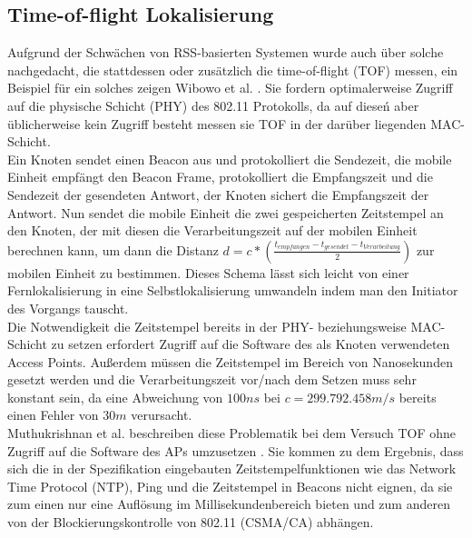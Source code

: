 \subsection{Time-of-flight Lokalisierung}
\label{ch:Vorherige:sec:TOF}
Aufgrund der Schwächen von RSS-basierten Systemen wurde auch über solche nachgedacht, die stattdessen oder zusätzlich die time-of-flight (TOF) messen, ein Beispiel für ein solches zeigen Wibowo et al. \cite{wibowo2009time}. 
Sie fordern optimalerweise Zugriff auf die physische Schicht (PHY) des 802.11 Protokolls, da auf dieseń aber üblicherweise kein Zugriff besteht messen sie TOF in der darüber liegenden MAC-Schicht.\\
Ein Knoten sendet einen Beacon aus und protokolliert die Sendezeit, die mobile Einheit empfängt den Beacon Frame, protokolliert die Empfangszeit und die Sendezeit der gesendeten Antwort, der Knoten sichert die Empfangszeit der Antwort.
Nun sendet die mobile Einheit die zwei gespeicherten Zeitstempel an den Knoten, der mit diesen die Verarbeitungszeit auf der mobilen Einheit berechnen kann, um dann die Distanz $d = c*(\frac{t_{empfangen} - t_{gesendet} - t_{Verarbeitung}}{2})$ zur mobilen Einheit zu bestimmen.
Dieses Schema lässt sich leicht von einer Fernlokalisierung in eine Selbstlokalisierung umwandeln indem man den Initiator des Vorgangs tauscht.\\
Die Notwendigkeit die Zeitstempel bereits in der PHY- beziehungsweise MAC-Schicht zu setzen erfordert Zugriff auf die Software des als Knoten verwendeten Access Points. 
Außerdem müssen die Zeitstempel im Bereich von Nanosekunden gesetzt werden und die Verarbeitungszeit vor/nach dem Setzen muss sehr konstant sein, da eine Abweichung von $100ns$ bei $c = 299.792.458m/s$ bereits einen Fehler von $30m$ verursacht.\\
Muthukrishnan et al. beschreiben diese Problematik bei dem Versuch TOF ohne Zugriff auf die Software des APs umzusetzen \cite{muthukrishnan2006using}.
Sie kommen zu dem Ergebnis, dass sich die in der Spezifikation eingebauten Zeitstempelfunktionen wie das Network Time Protocol (NTP), Ping und die Zeitstempel in Beacons nicht eignen, da sie zum einen nur eine Auflösung im Millisekundenbereich bieten und zum anderen von der Blockierungskontrolle von 802.11 (CSMA/CA) abhängen.

